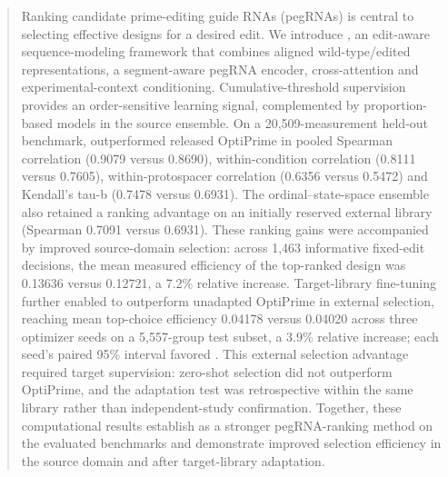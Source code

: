 \begin{abstract}
Ranking candidate prime-editing guide RNAs (pegRNAs) is central to selecting effective designs for a desired edit. We introduce \model{}, an edit-aware sequence-modeling framework that combines aligned wild-type/edited representations, a segment-aware pegRNA encoder, cross-attention and experimental-context conditioning. Cumulative-threshold supervision provides an order-sensitive learning signal, complemented by proportion-based models in the source ensemble. On a 20,509-measurement held-out benchmark, \model{} outperformed released OptiPrime in pooled Spearman correlation (0.9079 versus 0.8690), within-condition correlation (0.8111 versus 0.7605), within-protospacer correlation (0.6356 versus 0.5472) and Kendall's tau-b (0.7478 versus 0.6931). The ordinal--state-space ensemble also retained a ranking advantage on an initially reserved external library (Spearman 0.7091 versus 0.6931). These ranking gains were accompanied by improved source-domain selection: across 1,463 informative fixed-edit decisions, the mean measured efficiency of the top-ranked design was 0.13636 versus 0.12721, a 7.2\% relative increase. Target-library fine-tuning further enabled \model{} to outperform unadapted OptiPrime in external selection, reaching mean top-choice efficiency 0.04178 versus 0.04020 across three optimizer seeds on a 5,557-group test subset, a 3.9\% relative increase; each seed's paired 95\% interval favored \model{}. This external selection advantage required target supervision: zero-shot selection did not outperform OptiPrime, and the adaptation test was retrospective within the same library rather than independent-study confirmation. Together, these computational results establish \model{} as a stronger pegRNA-ranking method on the evaluated benchmarks and demonstrate improved selection efficiency in the source domain and after target-library adaptation.
\end{abstract}
